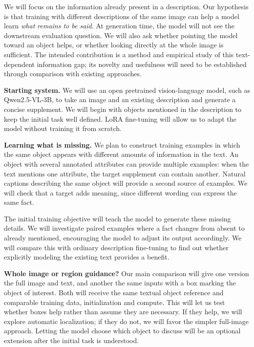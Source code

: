 \documentclass[11pt,twocolumn]{article}
\makeatletter
\renewcommand\section{\@startsection{section}{1}{0pt}{8pt plus 2pt minus 1pt}{4pt}{\large\bfseries}}
\makeatother
\begin{document}
We will focus on the information already present in a description. Our
hypothesis is that training with different descriptions of the same image can
help a model learn \emph{what remains to be said}. At generation time, the model
will not see the downstream evaluation question. We will also ask whether
pointing the model toward an object helps, or whether looking directly at the
whole image is sufficient. The intended contribution is a method and empirical
study of this text-dependent information gap; its novelty and usefulness will
need to be established through comparison with existing approaches.

\section{Proposed Method}
\textbf{Starting system.} We will use an open pretrained vision-language model,
such as Qwen2.5-VL-3B, to take an image and an existing description and generate
a concise supplement. We will begin with objects mentioned in the description
to keep the initial task well defined. LoRA fine-tuning will allow us to adapt
the model without training it from scratch.

\textbf{Learning what is missing.} We plan to construct training examples in
which the same object appears with different amounts of information in the
text. An object with several annotated attributes can provide multiple
examples: when the text mentions one attribute, the target supplement can
contain another. Natural captions describing the same object will provide a
second source of examples. We will check that a target adds meaning, since
different wording can express the same fact.

The initial training objective will teach the model to generate these missing
details. We will investigate paired examples where a fact changes from absent
to already mentioned, encouraging the model to adjust its output accordingly.
We will compare this with ordinary description fine-tuning to find out whether
explicitly modeling the existing text provides a benefit.

\textbf{Whole image or region guidance?} Our main comparison will give one
version the full image and text, and another the same inputs with a box marking
the object of interest. Both will receive the same textual object reference and
comparable training data, initialization and compute. This will let us test
whether boxes help rather than assume they are necessary. If they help, we will
explore automatic localization; if they do not, we will favor the simpler
full-image approach. Letting the model choose which object to discuss will be
an optional extension after the initial task is understood.
\end{document}
